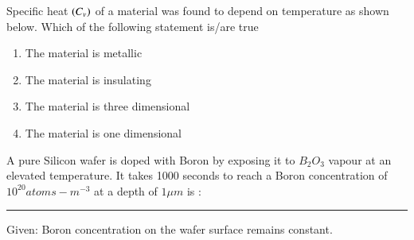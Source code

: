 \documentclass[journal]{IEEEtran}
\numberwithin{equation}{enumi}
\numberwithin{figure}{enumi}
\begin{document}

	\item Specific heat $\left(C_v\right)$ of a material was found to depend on temperature as shown below. Which of the following statement is/are true 
		\begin{enumerate}
			\item The material is metallic
			\item The material is insulating
			\item The material is three dimensional
			\item The material is one dimensional
		\end{enumerate}

	\item A pure Silicon wafer is doped with Boron by exposing it to $B_2O_3$ vapour at an elevated temperature. It takes 1000 seconds to reach a Boron concentration of $10^{20} atoms-m^{-3}$ at a depth of $1\mu m$ is :\rule{1cm}{0.1pt} 
	Given: Boron concentration on the wafer surface remains constant.

\end{document}
